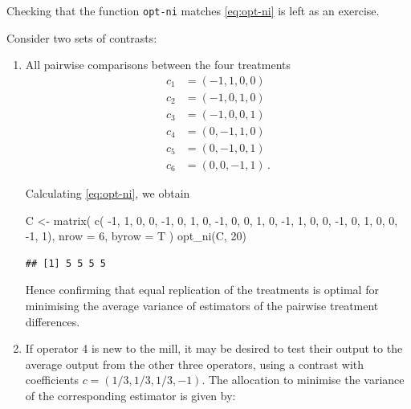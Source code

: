 \documentclass[
]{book}
\newenvironment{Shaded}{\begin{snugshade}}{\end{snugshade}}
\newcommand{\AttributeTok}[1]{\textcolor[rgb]{0.77,0.63,0.00}{#1}}
\newcommand{\DecValTok}[1]{\textcolor[rgb]{0.00,0.00,0.81}{#1}}
\newcommand{\FunctionTok}[1]{\textcolor[rgb]{0.00,0.00,0.00}{#1}}
\newcommand{\NormalTok}[1]{#1}
\newcommand{\OtherTok}[1]{\textcolor[rgb]{0.56,0.35,0.01}{#1}}
\newcommand{\SpecialCharTok}[1]{\textcolor[rgb]{0.00,0.00,0.00}{#1}}
\theoremstyle{definition}
\theoremstyle{definition}
\theoremstyle{definition}
\theoremstyle{definition}
\theoremstyle{remark}
\begin{document}
Checking that the function \texttt{opt-ni} matches \eqref{eq:opt-ni} is left as an exercise.

Consider two sets of contrasts:

\begin{enumerate}
\def\labelenumi{\arabic{enumi}.}
\item
  All pairwise comparisons between the four treatments
  \begin{align*}
  c_1 & = (-1, 1, 0, 0) \\
  c_2 & = (-1, 0, 1, 0) \\
  c_3 & = (-1, 0, 0, 1) \\
  c_4 & = (0, -1, 1, 0) \\
  c_5 & = (0, -1, 0, 1) \\
  c_6 & = (0, 0, -1, 1)\,.
  \end{align*}

  Calculating \eqref{eq:opt-ni}, we obtain

\begin{Shaded}
\begin{Highlighting}[]
\NormalTok{C }\OtherTok{\textless{}{-}} \FunctionTok{matrix}\NormalTok{(}
  \FunctionTok{c}\NormalTok{(}
\SpecialCharTok{{-}}\DecValTok{1}\NormalTok{, }\DecValTok{1}\NormalTok{, }\DecValTok{0}\NormalTok{, }\DecValTok{0}\NormalTok{,}
\SpecialCharTok{{-}}\DecValTok{1}\NormalTok{, }\DecValTok{0}\NormalTok{, }\DecValTok{1}\NormalTok{, }\DecValTok{0}\NormalTok{,}
\SpecialCharTok{{-}}\DecValTok{1}\NormalTok{, }\DecValTok{0}\NormalTok{, }\DecValTok{0}\NormalTok{, }\DecValTok{1}\NormalTok{,}
\DecValTok{0}\NormalTok{, }\SpecialCharTok{{-}}\DecValTok{1}\NormalTok{, }\DecValTok{1}\NormalTok{, }\DecValTok{0}\NormalTok{,}
\DecValTok{0}\NormalTok{, }\SpecialCharTok{{-}}\DecValTok{1}\NormalTok{, }\DecValTok{0}\NormalTok{, }\DecValTok{1}\NormalTok{,}
\DecValTok{0}\NormalTok{, }\DecValTok{0}\NormalTok{, }\SpecialCharTok{{-}}\DecValTok{1}\NormalTok{, }\DecValTok{1}\NormalTok{),}
  \AttributeTok{nrow =} \DecValTok{6}\NormalTok{, }\AttributeTok{byrow =}\NormalTok{ T}
\NormalTok{)}
\FunctionTok{opt\_ni}\NormalTok{(C, }\DecValTok{20}\NormalTok{)}
\end{Highlighting}
\end{Shaded}

\begin{verbatim}
## [1] 5 5 5 5
\end{verbatim}

  Hence confirming that equal replication of the treatments is optimal for minimising the average variance of estimators of the pairwise treatment differences.
\item
  If operator 4 is new to the mill, it may be desired to test their output to the average output from the other three operators, using a contrast with coefficients \(c = (1/3, 1/3, 1/3, -1)\). The allocation to minimise the variance of the corresponding estimator is given by:


\end{enumerate}
\end{document}
